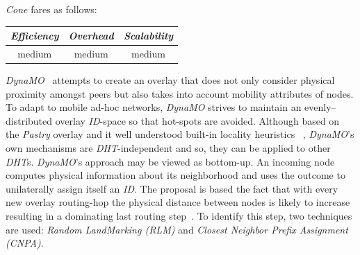 %
\emph{Cone} fares as follows: 
\begin{center}
{\footnotesize
\begin{tabular}{ccc}
\emph{Efficiency} & \emph{Overhead} & \emph{Scalability} \\
\hline
medium &
medium &
medium
\end{tabular}
}
\end{center}

\emph{DynaMO}~\cite{WZS2004} attempts to create an overlay that 
does not only consider physical proximity amongst peers but also
takes into account mobility attributes of nodes.
To adapt to mobile ad-hoc networks, \emph{DynaMO} strives
to maintain an evenly--distributed overlay \emph{ID}-space 
so that hot-spots are avoided. 
Although based on the \emph{Pastry} overlay and 
it well understood built-in locality heuristics ~\cite{CDCR2002a},
\emph{DynaMO}'s own mechanisms are \emph{DHT}-independent and 
so, they can be applied to other \emph{DHT}s.
\emph{DynaMO}'s approach may be viewed as bottom-up. 
An incoming node computes physical information about its neighborhood
and uses the outcome to unilaterally assign itself an \emph{ID}.
The proposal is based the fact that with every new overlay  routing-hop
the physical distance between nodes is likely to increase
resulting in a dominating 
last routing step~\cite{antony_pastry_2001,CDCR2002a}.
To identify this step, two techniques are used: 
\emph{Random LandMarking (RLM)} and 
\emph{Closest Neighbor Prefix Assignment (CNPA)}.

